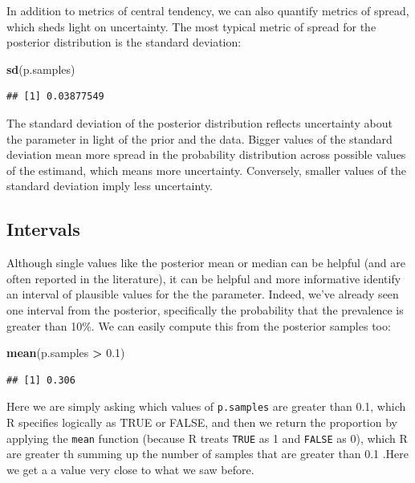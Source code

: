 \documentclass[
]{book}
\newenvironment{Shaded}{\begin{snugshade}}{\end{snugshade}}
\newcommand{\FloatTok}[1]{\textcolor[rgb]{0.00,0.00,0.81}{#1}}
\newcommand{\FunctionTok}[1]{\textcolor[rgb]{0.13,0.29,0.53}{\textbf{#1}}}
\newcommand{\NormalTok}[1]{#1}
\newcommand{\SpecialCharTok}[1]{\textcolor[rgb]{0.81,0.36,0.00}{\textbf{#1}}}
\begin{document}
In addition to metrics of central tendency, we can also quantify metrics
of spread, which sheds light on uncertainty. The most typical metric of
spread for the posterior distribution is the standard deviation:

\begin{Shaded}
\begin{Highlighting}[]
\FunctionTok{sd}\NormalTok{(p.samples)}
\end{Highlighting}
\end{Shaded}

\begin{verbatim}
## [1] 0.03877549
\end{verbatim}

The standard deviation of the posterior distribution reflects
uncertainty about the parameter in light of the prior and the data.
Bigger values of the standard deviation mean more spread in the
probability distribution across possible values of the estimand, which
means more uncertainty. Conversely, smaller values of the standard
deviation imply less uncertainty.

\subsection{Intervals}\label{intervals}

Although single values like the posterior mean or median can be helpful
(and are often reported in the literature), it can be helpful and more
informative identify an interval of plausible values for the the
parameter. Indeed, we've already seen one interval from the posterior,
specifically the probability that the prevalence is greater than 10\%. We
can easily compute this from the posterior samples too:

\begin{Shaded}
\begin{Highlighting}[]
\FunctionTok{mean}\NormalTok{(p.samples }\SpecialCharTok{\textgreater{}} \FloatTok{0.1}\NormalTok{)}
\end{Highlighting}
\end{Shaded}

\begin{verbatim}
## [1] 0.306
\end{verbatim}

Here we are simply asking which values of \texttt{p.samples} are greater than
0.1, which R specifies logically as TRUE or FALSE, and then we return
the proportion by applying the \texttt{mean} function (because R treats \texttt{TRUE}
as 1 and \texttt{FALSE} as 0), which R are greater th summing up the number of
samples that are greater than 0.1 .Here we get a a value very close to
what we saw before.
\end{document}
